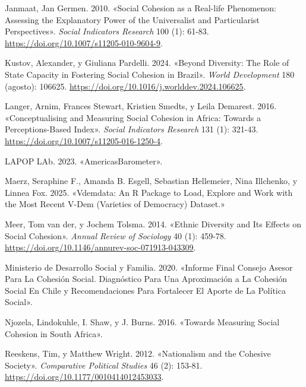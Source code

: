 \documentclass[
  letterpaper,
  DIV=11,
  numbers=noendperiod]{scrartcl}
\newlength{\cslhangindent}
\newenvironment{CSLReferences}[2] %
 {\begin{list}{}{%
  \setlength{\itemindent}{0pt}
  \setlength{\leftmargin}{0pt}
  \setlength{\parsep}{0pt}
  \ifodd #1
   \setlength{\leftmargin}{\cslhangindent}
   \setlength{\itemindent}{-1\cslhangindent}
  \fi
  \setlength{\itemsep}{#2\baselineskip}}}
 {\end{list}}
\begin{document}
\begin{CSLReferences}{1}{0}
Janmaat, Jan Germen. 2010. {«Social {Cohesion} as a {Real-life
Phenomenon}: {Assessing} the {Explanatory Power} of the {Universalist}
and {Particularist Perspectives}»}. \emph{Social Indicators Research}
100 (1): 61-83. \url{https://doi.org/10.1007/s11205-010-9604-9}.

Kustov, Alexander, y Giuliana Pardelli. 2024. {«Beyond {Diversity}: {The
Role} of {State Capacity} in {Fostering Social Cohesion} in {Brazil}»}.
\emph{World Development} 180 (agosto): 106625.
\url{https://doi.org/10.1016/j.worlddev.2024.106625}.

Langer, Arnim, Frances Stewart, Kristien Smedts, y Leila Demarest. 2016.
{«Conceptualising and {Measuring Social Cohesion} in {Africa}: {Towards}
a {Perceptions-Based Index}»}. \emph{Social Indicators Research} 131
(1): 321-43. \url{https://doi.org/10.1007/s11205-016-1250-4}.

LAPOP LAb. 2023. {«{AmericasBarometer}»}.

Maerz, Seraphine F., Amanda B. Esgell, Sebastian Hellemeier, Nina
Illchenko, y Linnea Fox. 2025. {«Vdemdata: {An R} Package to Load,
Explore and Work with the Most Recent {V-Dem} ({Varieties} of
{Democracy}) Dataset.»}

Meer, Tom van der, y Jochem Tolsma. 2014. {«Ethnic {Diversity} and {Its
Effects} on {Social Cohesion}»}. \emph{Annual Review of Sociology} 40
(1): 459-78. \url{https://doi.org/10.1146/annurev-soc-071913-043309}.

Ministerio de Desarrollo Social y Familia. 2020. {«Informe {Final
Consejo Asesor} Para La {Cohesi{ó}n Social}. {Diagn{ó}stico} Para Una
Aproximaci{ó}n a La Cohesi{ó}n Social En {Chile} y Recomendaciones Para
Fortalecer El Aporte de La Pol{í}tica Social»}.

Njozela, Lindokuhle, I. Shaw, y J. Burns. 2016. {«Towards Measuring
Social Cohesion in {South Africa}»}.

Reeskens, Tim, y Matthew Wright. 2012. {«Nationalism and the {Cohesive
Society}»}. \emph{Comparative Political Studies} 46 (2): 153-81.
\url{https://doi.org/10.1177/0010414012453033}.


\end{CSLReferences}
\end{document}
